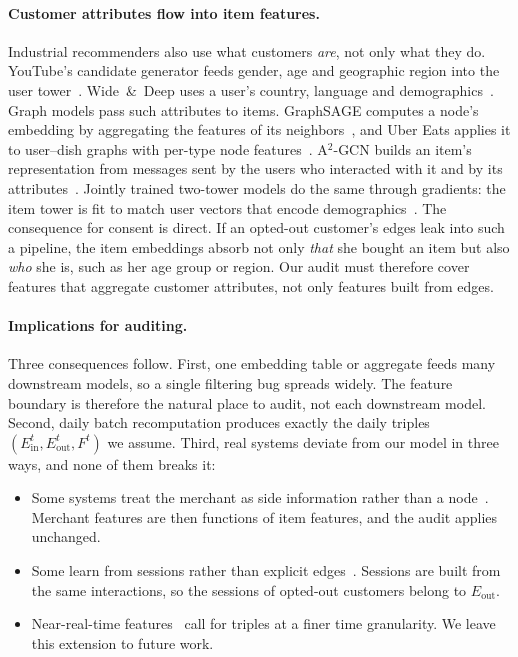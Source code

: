 \documentclass[10pt,twocolumn,letterpaper]{article}
\theoremstyle{definition}
\newcommand{\Ein}{E_{\mathrm{in}}}
\newcommand{\Eout}{E_{\mathrm{out}}}
\begin{document}
\paragraph{Customer attributes flow into item features.}
Industrial recommenders also use what customers \emph{are}, not only what they
do. YouTube's candidate generator feeds gender, age and geographic region into
the user tower~\citep{covington2016deep}. Wide~\&~Deep uses a user's country,
language and demographics~\citep{cheng2016wide}. Graph models pass such
attributes to items. GraphSAGE computes a node's embedding by aggregating the
features of its neighbors~\citep{hamilton2017graphsage}, and Uber Eats applies
it to user--dish graphs with per-type node features~\citep{sarda2019ubereats}.
A$^2$-GCN builds an item's representation from messages sent by the users who
interacted with it and by its attributes~\citep{liu2022a2gcn}. Jointly trained
two-tower models do the same through gradients: the item tower is fit to
match user vectors that encode demographics~\citep{yi2019sampling}. The
consequence for consent is direct. If an opted-out customer's edges leak into
such a pipeline, the item embeddings absorb not only \emph{that} she bought an
item but also \emph{who} she is, such as her age group or region. Our audit
must therefore cover features that aggregate customer attributes, not only
features built from edges.

\paragraph{Implications for auditing.}
Three consequences follow. First, one embedding table or aggregate feeds many
downstream models, so a single filtering bug spreads widely. The feature
boundary is therefore the natural place to audit, not each downstream model.
Second, daily batch recomputation produces exactly the daily triples
$(\Ein^t,\Eout^t,F^t)$ we assume. Third, real systems deviate from our model
in three ways, and none of them breaks it:
\begin{itemize}
  \item Some systems treat the merchant as side information rather than a
        node~\citep{wang2018billion}. Merchant features are then functions of
        item features, and the audit applies unchanged.
  \item Some learn from sessions rather than explicit
        edges~\citep{grbovic2018real,wang2018billion}. Sessions are built from
        the same interactions, so the sessions of opted-out customers belong to
        $\Eout$.
  \item Near-real-time features~\citep{hermann2017michelangelo} call for
        triples at a finer time granularity. We leave this extension to future
        work.
\end{itemize}
\end{document}
